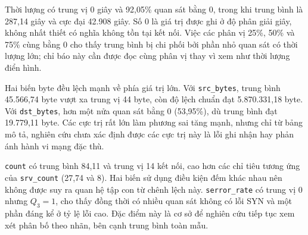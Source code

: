 Thời lượng có trung vị 0 giây và 92,05\% quan sát bằng 0, trong khi trung bình là 287,14 giây và cực đại 42.908 giây. Số 0 là giá trị được ghi ở độ phân giải giây, không nhất thiết có nghĩa không tồn tại kết nối. Việc các phân vị 25\%, 50\% và 75\% cùng bằng 0 cho thấy trung bình bị chi phối bởi phần nhỏ quan sát có thời lượng lớn; chỉ báo này cần được đọc cùng phân vị thay vì xem như thời lượng điển hình.

Hai biến byte đều lệch mạnh về phía giá trị lớn. Với \texttt{src\_bytes}, trung bình 45.566,74 byte vượt xa trung vị 44 byte, còn độ lệch chuẩn đạt 5.870.331,18 byte. Với \texttt{dst\_bytes}, hơn một nửa quan sát bằng 0 (53,95\%), dù trung bình đạt 19.779,11 byte. Các cực trị rất lớn làm phương sai tăng mạnh, nhưng chỉ từ bảng mô tả, nghiên cứu chưa xác định được các cực trị này là lỗi ghi nhận hay phản ánh hành vi mạng đặc thù.

\texttt{count} có trung bình 84,11 và trung vị 14 kết nối, cao hơn các chỉ tiêu tương ứng của \texttt{srv\_count} (27,74 và 8). Hai biến sử dụng điều kiện đếm khác nhau nên không được suy ra quan hệ tập con từ chênh lệch này. \texttt{serror\_rate} có trung vị 0 nhưng $Q_3=1$, cho thấy đồng thời có nhiều quan sát không có lỗi SYN và một phần đáng kể ở tỷ lệ lỗi cao. Đặc điểm này là cơ sở để nghiên cứu tiếp tục xem xét phân bố theo nhãn, bên cạnh trung bình toàn mẫu.
\FloatBarrier

